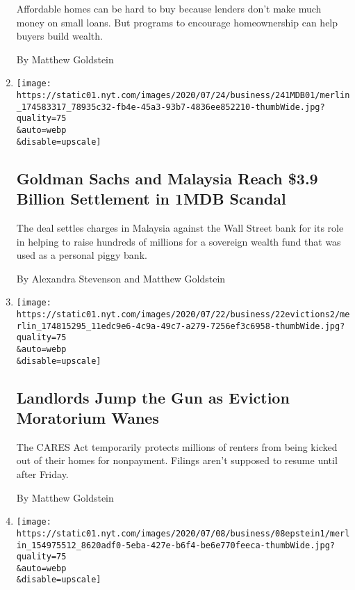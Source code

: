 \begin{enumerate}
  Affordable homes can be hard to buy because lenders don't make much
  money on small loans. But programs to encourage homeownership can help
  buyers build wealth.

  By Matthew Goldstein
\item
  \href{/2020/07/24/business/goldman-sachs-malaysia-1mdb.html}{}

  \texttt{[image: https://static01.nyt.com/images/2020/07/24/business/241MDB01/merlin\_174583317\_78935c32-fb4e-45a3-93b7-4836ee852210-thumbWide.jpg?quality=75\\\&auto=webp\\\&disable=upscale]}

  \hypertarget{goldman-sachs-and-malaysia-reach-39-billion-settlement-in-1mdb-scandal}{%
  \subsection{Goldman Sachs and Malaysia Reach \$3.9 Billion Settlement
  in 1MDB
  Scandal}\label{goldman-sachs-and-malaysia-reach-39-billion-settlement-in-1mdb-scandal}}

  The deal settles charges in Malaysia against the Wall Street bank for
  its role in helping to raise hundreds of millions for a sovereign
  wealth fund that was used as a personal piggy bank.

  By Alexandra Stevenson and Matthew Goldstein
\item
  \href{/2020/07/23/business/evictions-moratorium-cares-act.html}{}

  \texttt{[image: https://static01.nyt.com/images/2020/07/22/business/22evictions2/merlin\_174815295\_11edc9e6-4c9a-49c7-a279-7256ef3c6958-thumbWide.jpg?quality=75\\\&auto=webp\\\&disable=upscale]}

  \hypertarget{landlords-jump-the-gun-as-eviction-moratorium-wanes}{%
  \subsection{Landlords Jump the Gun as Eviction Moratorium
  Wanes}\label{landlords-jump-the-gun-as-eviction-moratorium-wanes}}

  The CARES Act temporarily protects millions of renters from being
  kicked out of their homes for nonpayment. Filings aren't supposed to
  resume until after Friday.

  By Matthew Goldstein
\item
  \href{/2020/07/07/business/jeffrey-epstein-deutsche-bank-settlement.html}{}

  \texttt{[image: https://static01.nyt.com/images/2020/07/08/business/08epstein1/merlin\_154975512\_8620adf0-5eba-427e-b6f4-be6e770feeca-thumbWide.jpg?quality=75\\\&auto=webp\\\&disable=upscale]}


\end{enumerate}
